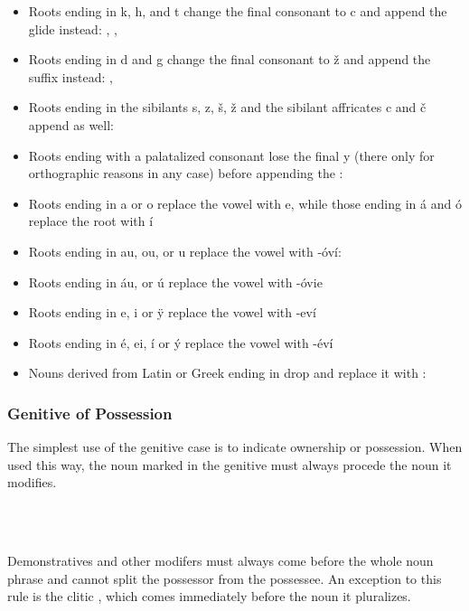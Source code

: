 \begin{itemize}
	\item Roots ending in k, h, and t change the final consonant to c and append the glide  instead:  ,  ,  
	\item Roots ending in d and g change the final consonant to ž and append the suffix  instead:  ,  
	\item Roots ending in the sibilants s, z, š, ž and the sibilant affricates c and č append  as well:
	\item Roots ending with a palatalized consonant lose the final y (there only for orthographic reasons in any case) before appending the : 
	\item Roots ending in a or o replace the vowel with e, while those ending in á and ó replace the root with í
	\item Roots ending in au, ou, or u replace the vowel with -óví:  
	\item Roots ending in áu, or ú replace the vowel with -óvie
	\item Roots ending in e, i or \"y replace the vowel with -eví
	\item Roots ending in é, ei, í or \'y replace the vowel with -éví
  \item Nouns derived from Latin or Greek ending in  drop  and replace it with : 
\end{itemize}


\subsubsection{Genitive of Possession}

The simplest use of the genitive case is to indicate ownership or possession.
When used this way, the noun marked in the genitive must always procede the noun
it modifies.


\pex
{}\\
\\
\xe

Demonstratives and other modifers must always come before
the whole noun phrase and cannot split the possessor from the possessee. An
exception to this rule is the clitic , which comes immediately before
the noun it pluralizes.


